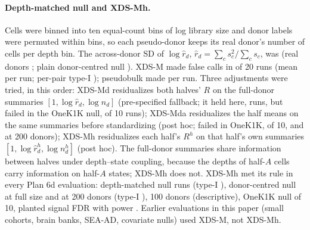 \paragraph{Depth-matched null and XDS-Mh.} Cells were binned into ten equal-count bins of log library size and donor labels were permuted within bins, so each pseudo-donor keeps its real donor's number of cells per depth bin. The across-donor SD of $\log\hat r_d$, $\hat r_d=\sum_cs_c^2/\sum_cs_c$, was \DmSDthis{} (real donors \DmSDreal{}; plain donor-centred null \DmSDplain). XDS-M made false calls in \DmXany{} of 20 runs (mean \DmXmean{} per run; per-pair type-I \DmXtI); pseudobulk made \DmPB{} per run. Three adjustments were tried, in this order: XDS-Md residualizes both halves' $R$ on the full-donor summaries $[1,\log\hat r_d,\log n_d]$ (pre-specified fallback; it held here, \DmXdany{} runs, but failed in the OneK1K null, \OnXdany{} of 10 runs); XDS-Mda residualizes the half means on the same summaries before standardizing (post hoc; failed in OneK1K, \OnXdaany{} of 10, and at 200 donors); XDS-Mh residualizes each half's $R^h$ on that half's own summaries $[1,\log\hat r^h_d,\log n^h_d]$ (post hoc). The full-donor summaries share information between halves under depth--state coupling, because the depths of half-$A$ cells carry information on half-$A$ states; XDS-Mh does not. XDS-Mh met its rule in every Plan 6d evaluation: depth-matched null \MhDany{} runs (type-I \MhDtI), donor-centred null at full size \MhAany{} and at 200 donors \MhTwoany{} (type-I \MhAlltI), 100 donors \MhHundany{} (descriptive), OneK1K null \MhOany{} of 10, planted signal FDR \MhSfdr{} with power \MhSpow. Earlier evaluations in this paper (small cohorts, brain banks, SEA-AD, covariate nulls) used XDS-M, not XDS-Mh.

